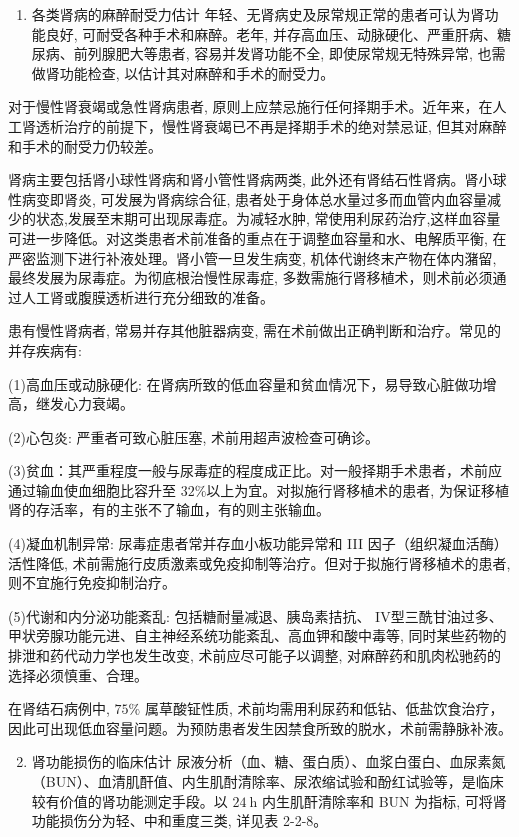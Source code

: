 \documentclass[10pt]{article}
\begin{document}
\begin{enumerate}
  \item 各类肾病的麻醉耐受力估计 年轻、无肾病史及尿常规正常的患者可认为肾功能良好, 可耐受各种手术和麻醉。老年, 并存高血压、动脉硬化、严重肝病、糖尿病、前列腺肥大等患者, 容易并发肾功能不全, 即使尿常规无特殊异常, 也需做肾功能检查, 以估计其对麻醉和手术的耐受力。
\end{enumerate}

对于慢性肾衰竭或急性肾病患者, 原则上应禁忌施行任何择期手术。近年来，在人工肾透析治疗的前提下，慢性肾衰竭已不再是择期手术的绝对禁忌证, 但其对麻醉和手术的耐受力仍较差。

肾病主要包括肾小球性肾病和肾小管性肾病两类, 此外还有肾结石性肾病。肾小球性病变即肾炎, 可发展为肾病综合征, 患者处于身体总水量过多而血管内血容量减少的状态,发展至末期可出现尿毒症。为减轻水肿, 常使用利尿药治疗,这样血容量可进一步降低。对这类患者术前准备的重点在于调整血容量和水、电解质平衡, 在严密监测下进行补液处理。肾小管一旦发生病变, 机体代谢终末产物在体内潴留, 最终发展为尿毒症。为彻底根治慢性尿毒症, 多数需施行肾移植术，则术前必须通过人工肾或腹膜透析进行充分细致的准备。

患有慢性肾病者, 常易并存其他脏器病变, 需在术前做出正确判断和治疗。常见的并存疾病有:

(1)高血压或动脉硬化: 在肾病所致的低血容量和贫血情况下，易导致心脏做功增高，继发心力衰竭。

(2)心包炎: 严重者可致心脏压塞, 术前用超声波检查可确诊。

(3)贫血：其严重程度一般与尿毒症的程度成正比。对一般择期手术患者，术前应通过输血使血细胞比容升至 $32 \%$以上为宜。对拟施行肾移植术的患者, 为保证移植肾的存活率，有的主张不了输血，有的则主张输血。

(4)凝血机制异常: 尿毒症患者常并存血小板功能异常和 III 因子（组织凝血活酶）活性降低, 术前需施行皮质激素或免疫抑制等治疗。但对于拟施行肾移植术的患者, 则不宜施行免疫抑制治疗。

(5)代谢和内分泌功能紊乱: 包括糖耐量减退、胰岛素拮抗、 IV型三酰甘油过多、甲状旁腺功能元进、自主神经系统功能紊乱、高血钾和酸中毒等, 同时某些药物的排泄和药代动力学也发生改变, 术前应尽可能子以调整, 对麻醉药和肌肉松驰药的选择必须慎重、合理。

在肾结石病例中, $75 \%$ 属草酸钲性质, 术前均需用利尿药和低钻、低盐饮食治疗，因此可出现低血容量问题。为预防患者发生因禁食所致的脱水，术前需静脉补液。

\begin{enumerate}
  \setcounter{enumi}{1}
  \item 肾功能损伤的临床估计 尿液分析（血、糖、蛋白质）、血浆白蛋白、血尿素氮（BUN）、血清肌酐值、内生肌酎清除率、尿浓缩试验和酚红试验等，是临床较有价值的肾功能测定手段。以 $24 \mathrm{~h}$ 内生肌酐清除率和 BUN 为指标, 可将肾功能损伤分为轻、中和重度三类, 详见表 2-2-8。
\end{enumerate}
\end{document}
